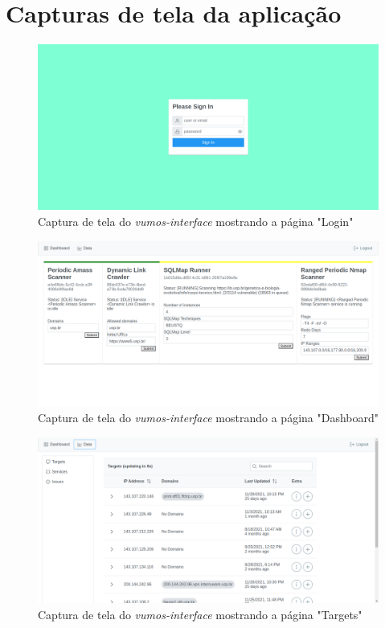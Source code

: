 \chapter{Capturas de tela da aplicação}
\label{ap:prints}

\begin{figure}[H]
    \includegraphics[scale=0.32]{figuras/vumos-interface-login.png}
    \caption{Captura de tela do \textit{vumos-interface} mostrando a página "Login"}
\end{figure}

\begin{figure}[H]
    \includegraphics[scale=0.32]{figuras/vumos-interface-modules.png}
    \caption{Captura de tela do \textit{vumos-interface} mostrando a página "Dashboard"}
\end{figure}

\begin{figure}[H]
    \includegraphics[scale=0.32]{figuras/vumos-interface-targets.png}
    \caption{Captura de tela do \textit{vumos-interface} mostrando a página "Targets"}
\end{figure}

